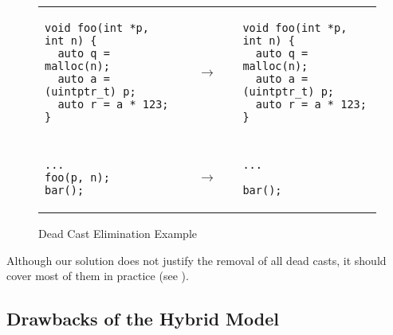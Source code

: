 \begin{figure}[t]
\small \center
\begin{tabular}{@{}l@{}l@{~~}l}
\begin{minipage}{0.4\textwidth}
\begin{verbatim}
void foo(int *p, int n) {
  auto q = malloc(n);
  auto a = (uintptr_t) p;
  auto r = a * 123;
}
\end{verbatim}
\end{minipage}
&
$\quad\rightarrow\quad$
&
\begin{minipage}{0.4\textwidth}
\begin{verbatim}
void foo(int *p, int n) {
  auto q = malloc(n);
  auto a = (uintptr_t) p;
  auto r = a * 123;
}
\end{verbatim}
\end{minipage}
\\
\\
\begin{minipage}{0.4\textwidth}
\begin{verbatim}
...
foo(p, n);
bar();
\end{verbatim}
\end{minipage}
&
$\quad\rightarrow\quad$
&
\begin{minipage}{0.4\textwidth}
\begin{verbatim}
...

bar();
\end{verbatim}
\end{minipage}
\end{tabular}
\caption{Dead Cast Elimination Example}
\label{fig:intptrcast:formal-semantics:deadcast}
\end{figure}

Although our solution does not justify the removal of all dead casts,
it should cover most of them in practice (see ).



\subsection{Drawbacks of the Hybrid Model}
\label{sec:intptrcast:formal-semantics:drawbacks}


